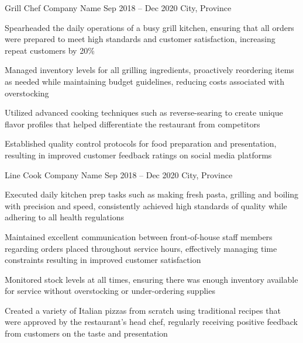 \documentclass[letterpaper]{resume_config}
\begin{document}
\WorkExperience
    {Grill Chef} %
    {Company Name} %
    {Sep 2018 -- Dec 2020} %
    {City, Province} %
    {
        \item Spearheaded the daily operations of a busy grill kitchen, ensuring that all orders were prepared to meet high standards and customer satisfaction, increasing repeat customers by 20\%
        \item Managed inventory levels for all grilling ingredients, proactively reordering items as needed while maintaining budget guidelines, reducing costs associated with overstocking
        \item Utilized advanced cooking techniques such as reverse-searing to create unique flavor profiles that helped differentiate the restaurant from competitors
        \item Established quality control protocols for food preparation and presentation, resulting in improved customer feedback ratings on social media platforms
    }

\WorkExperience
    {Line Cook} %
    {Company Name} %
    {Sep 2018 -- Dec 2020} %
    {City, Province} %
    {
        \item Executed daily kitchen prep tasks such as making fresh pasta, grilling and boiling with precision and speed, consistently achieved high standards of quality while adhering to all health regulations
        \item Maintained excellent communication between front-of-house staff members regarding orders placed throughout service hours, effectively managing time constraints resulting in improved customer satisfaction
        \item Monitored stock levels at all times, ensuring there was enough inventory available for service without overstocking or under-ordering supplies
        \item Created a variety of Italian pizzas from scratch using traditional recipes that were approved by the restaurant's head chef, regularly receiving positive feedback from customers on the taste and presentation
    }

\vspace{-10pt}
\end{document}
